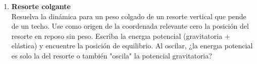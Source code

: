\documentclass[11pt,spanish,a4paper]{article}
\begin{document}
\begin{enumerate}
\item 
\textbf{Resorte colgante}\\
Resuelva la dinámica para un peso colgado de un resorte vertical que pende de un techo.
Use como origen de la coordenada relevante cero la posición del resorte en reposo sin peso.
Escriba la energıa potencial (gravitatoria + elástica) y encuentre la posición de equilibrio.
Al oscilar, ¿la energıa potencial es solo la del resorte o también "oscila" la potencial gravitatoria?



\end{enumerate}
\end{document}
